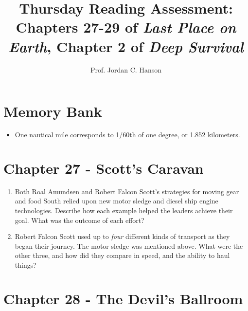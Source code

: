 \documentclass{article}
\begin{document}
\title{Thursday Reading Assessment: Chapters 27-29 of \textit{Last Place on Earth}, Chapter 2 of \textit{Deep Survival}}
\author{Prof. Jordan C. Hanson}

\maketitle

\section{Memory Bank}

\begin{itemize}
\item One nautical mile corresponds to 1/60th of one degree, or 1.852 kilometers.
\end{itemize}

\section{Chapter 27 - Scott's Caravan}

\begin{enumerate}
\item Both Roal Amundsen and Robert Falcon Scott's strategies for moving gear and food South relied upon new motor sledge and diesel ship engine technologies.  Describe how each example helped the leaders achieve their goal.  What was the outcome of each effort? \\ \vspace{2cm}
\item Robert Falcon Scott used up to \textit{four} different kinds of transport as they began their journey.  The motor sledge was mentioned above.  What were the other three, and how did they compare in speed, and the ability to haul things? \\ \vspace{2cm}
\end{enumerate}

\section{Chapter 28 - The Devil's Ballroom}
\end{document}
